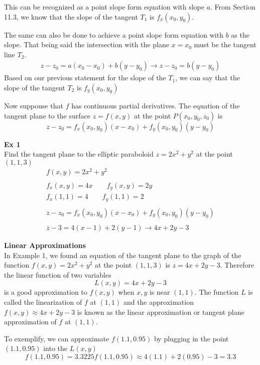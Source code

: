 \documentclass{article}
\begin{document}
  This can be recognized as a point slope form equation with slope $ a $. From Section 11.3, we know that the slope of the tangent $ T_{1}  $ is $ f_{x} (x_{0},y_{0})$. 

  The same can also be done to achieve a point slope form equation with $ b $ as the slope. That being said the intersection with the plane $ x=x_{0}  $ must be the tangent line $ T_{2} $. 
  \[
    \begin{gathered}
    z-z_{0}=a(x_{0} -x_{0})+b(y -y_{0} ) \to 
    z-z_{0}=b(y-y_{0} ) 
    \end{gathered}
  \]
  Based on our previous statement for the slope of the $ T_{1}  $, we can say that the slope of the tangent $ T_{2}  $ is $ f_{y}(x_{0},y_{0}  )  $  

  Now suppouse that $ f $ has continuous partial derivatives. The equation of the tangent plane to the surface $ z=f(x,y) $ at the point $ P(x_{0},y_{0},z_{0}   ) $ is
  \[
    z-z_{0}=f_{x}(x_{0},y_{0}  )(x-x_{0})+f_{y}(x_{0},y_{0}  )(y-y_{0} )   
  \]

  \textbf{Ex 1}\\
  Find the tangent plane to the elliptic paraboloid $ z=2x^{2}+y^{2}   $ at the point $ (1,1,3) $
  \[
    \begin{gathered}
    f(x,y) = 2x^{2}+y^{2}\\
    ~\\
    f_{x}(x,y)=4x \qquad f_{y}(x,y)=2y\\
    f_{x}(1,1)=4 \qquad f_{y}(1,1)=2\\
    ~\\
     z-z_{0}=f_{x}(x_{0},y_{0}  )(x-x_{0})+f_{y}(x_{0},y_{0}  )(y-y_{0} )\\
     ~\\
     z-3=4(x-1)+2(y-1)\to \boxed{4x+2y-3}   
    \end{gathered}
  \]

  \textbf{Linear Approximations}\\
  In Example 1, we found an equation of the tangent plane to the graph of the function $ f(x,y)=2x^{2}+y^{2}   $ at the point $ (1,1,3) $ is $ z=4x+2y-3 $. Therefore the linear function of two variables
  \[
    L(x,y)=4x+2y-3
  \]
  is a good approximation to $ f(x,y) $ when $ x,y $ is near $ (1,1) $. The function $ L $ is called the linearization of $ f $ at $ (1,1) $ and the approximation $ f(x,y) \approx 4x+2y-3 $ is known as the linear approximation or tangent plane approximation of $ f $ at $ (1,1) $.

  To exemplify, we can approximate $ f(1.1,0.95)$ by plugging in the point $ (1.1,0.95) $ into the $ L(x,y) $ 
  \[
    f(1.1,0.95)=3.3225
    f(1.1,0.95) \approx 4(1.1) + 2(0.95)-3=3.3
  \]
  
\end{document}

